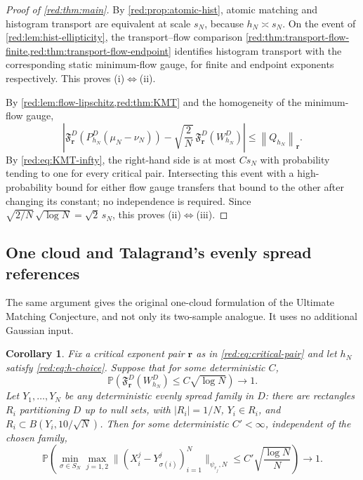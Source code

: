 \documentclass[11pt]{article}
\newtheorem{corollary}[corollary]{Corollary}
\theoremstyle{definition}
\theoremstyle{remark}
\numberwithin{equation}{section}
\newcommand{\Pp}{\mathbb P}
\newcommand{\norm}[1]{\left\|#1\right\|}
\begin{document}
\begin{proof}[Proof of \cref{red:thm:main}]
By \cref{red:prop:atomic-hist}, atomic matching and histogram transport are
equivalent at scale $s_N$, because $h_N\asymp s_N$. On the event of
\cref{red:lem:hist-ellipticity}, the transport--flow comparison
\cref{red:thm:transport-flow-finite,red:thm:transport-flow-endpoint}
identifies histogram transport with the corresponding static minimum-flow
gauge, for finite and endpoint exponents respectively. This proves
(i)$\Leftrightarrow$(ii).

By \cref{red:lem:flow-lipschitz,red:thm:KMT} and the homogeneity of
the minimum-flow gauge,
\[
 \left|\mathfrak F_{\boldsymbol r}^{D}
       (P_{h_N}^D(\mu_N-\nu_N))
       -\sqrt{\frac2N}\,\mathfrak F_{\boldsymbol r}^{D}(W_{h_N}^{D})
 \right|\le\norm{Q_{h_N}}_{\boldsymbol r}.
\]
By \eqref{red:eq:KMT-infty}, the right-hand side is at most $Cs_N$ with
probability tending to one for every critical pair. Intersecting
this event with a high-probability bound for either flow gauge
transfers that bound to the other after changing its constant;
no independence is required. Since
$\sqrt{2/N}\,\sqrt{\log N}=\sqrt2\,s_N$,
this proves (ii)$\Leftrightarrow$(iii).
\end{proof}


\subsection{One cloud and Talagrand's evenly spread references}

The same argument gives the original one-cloud formulation of the
Ultimate Matching Conjecture, and not only its two-sample analogue.
It uses no additional Gaussian input.

\begin{corollary}
\label{red:cor:evenly-spread}
Fix a critical exponent pair $\boldsymbol r$ as in
\eqref{red:eq:critical-pair} and let $h_N$ satisfy
\eqref{red:eq:h-choice}. Suppose that for some deterministic $C$,
\begin{equation}\label{red:eq:one-cloud-input}
 \Pp\!\left(\mathfrak F_{\boldsymbol r}^D(W_{h_N}^D)
       \le C\sqrt{\log N}\right)\longrightarrow1.
\end{equation}
Let $Y_1,\ldots,Y_N$ be any deterministic evenly spread family in
$D$: there are rectangles $R_i$ partitioning $D$ up to null sets,
with $|R_i|=1/N$, $Y_i\in R_i$, and
$R_i\subset B(Y_i,10/\sqrt N)$. Then for some deterministic
$C'<\infty$, independent of the chosen family,
\begin{equation}\label{red:eq:one-cloud-matching}
 \Pp\!\left(\min_{\sigma\in S_N}\max_{j=1,2}
 \bigl\|(X_i^j-Y_{\sigma(i)}^j)_{i=1}^N\bigr\|_{\psi_{r_j},N}
 \le C'\sqrt{\frac{\log N}{N}}\right)\longrightarrow1.
\end{equation}
\end{corollary}
\end{document}
